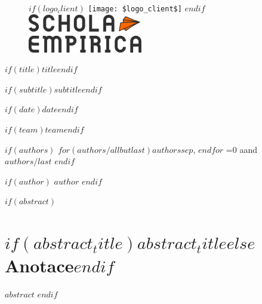\documentclass[12pt,a4paper,$for(classoption)$$classoption$$sep$,$endfor$]{$documentclass$}
\newcommand{\tr}[2]{\ifnum\pdfstrcmp{\languagename}{czech}=0 #1\else #2\fi}
\begin{document}
\begin{titlepage}
    \begin{center}

      \onehalfspacing

      \vspace*{1cm}

      \begin{figure}
      \centering
      $if(logo_client)$
      \texttt{[image: \$logo\_client\$]}%
      \hspace{1.5cm}%
      $endif$
      \includegraphics[width=5cm]{logos/scholaLogoNew3}%
      \end{figure}

      \vspace{1cm}

      \textbf{\huge $if(title)$$title$$endif$}

      \vspace{.25cm}

      \textit{\Large $if(subtitle)$$subtitle$$endif$}

      \vspace{1cm}

      \large

      $if(date)$$date$$endif$

      \vspace{1cm}

      $if(team)$$team$$endif$

      \vspace{.25cm}

      $if(authors)$
      $for(authors/allbutlast)$$authors$$sep$, $endfor$ \tr{a}{and}~$authors/last$
      $endif$

      $if(author)$
      $author$
      $endif$

      \vspace{1.5cm}

    \end{center}
\end{titlepage}


$if(abstract)$
\thispagestyle{empty}
\section*{$if(abstract_title)$$abstract_title$$else$Anotace$endif$}
$abstract$
$endif$
\end{document}
